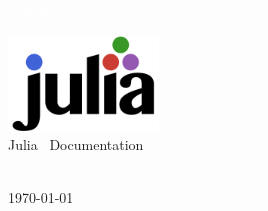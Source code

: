 
\begin{titlingpage}
    \BgThispage
    \vspace*{2cm}\noindent

    \textcolor{white}{ \MainHeading  \DocMainTitle } 
    \\[0.6cm]
    \textcolor{white}{
        \SecondaryHeading A fresh approach to technical computing.
    }
    \vspace*{3cm}\par\noindent

    \begin{center}
        \includegraphics[width=0.3\textwidth]{./assets/logo} 
        \\[1.5cm]
        { \SecondaryHeading Julia \DocVersion\ Documentation } 
        \vfill
        
        { \huge  \DocAuthors }
        \\[0.5cm]
        { \huge \today }
    \end{center} 
\end{titlingpage}
\restoregeometry
